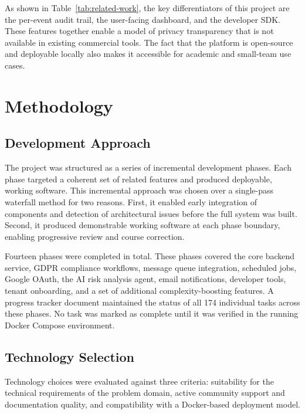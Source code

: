 \documentclass[a4paper,12pt,onecolumn]{report}
\begin{document}
As shown in Table~\ref{tab:related-work}, the key differentiators of this project are the per-event audit trail, the user-facing dashboard, and the developer SDK.
These features together enable a model of privacy transparency that is not available in existing commercial tools.
The fact that the platform is open-source and deployable locally also makes it accessible for academic and small-team use cases.


\chapter{Methodology}

\section{Development Approach}

The project was structured as a series of incremental development phases.
Each phase targeted a coherent set of related features and produced deployable, working software.
This incremental approach was chosen over a single-pass waterfall method for two reasons.
First, it enabled early integration of components and detection of architectural issues before the full system was built.
Second, it produced demonstrable working software at each phase boundary, enabling progressive review and course correction.

Fourteen phases were completed in total.
These phases covered the core backend service, GDPR compliance workflows, message queue integration, scheduled jobs, Google OAuth, the AI risk analysis agent, email notifications, developer tools, tenant onboarding, and a set of additional complexity-boosting features.
A progress tracker document maintained the status of all 174 individual tasks across these phases.
No task was marked as complete until it was verified in the running Docker Compose environment.

\section{Technology Selection}

Technology choices were evaluated against three criteria: suitability for the technical requirements of the problem domain, active community support and documentation quality, and compatibility with a Docker-based deployment model.
\end{document}
